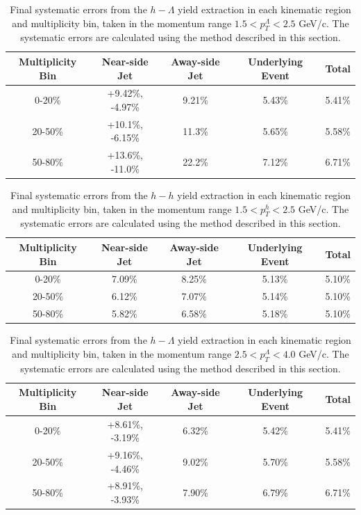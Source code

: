 \documentclass[ALICE,manyauthors]{ALICE_analysis_notes}
\begin{document}
\begin{table}[h!]
\centering
\begin{tabular}{| c | c | c | c | c | }
\hline
Multiplicity Bin & Near-side Jet & Away-side Jet & Underlying Event & Total  \\
\hline
0-20\% & +9.42\%, -4.97\% & 9.21\%  & 5.43\% & 5.41\% \\
20-50\% & +10.1\%, -6.15\%  & 11.3\%  & 5.65\% & 5.58\% \\
50-80\% & +13.6\%, -11.0\%  & 22.2\%  & 7.12\% & 6.71\% \\
\hline
\end{tabular}
\caption{Final systematic errors from the $h-\Lambda$ yield extraction in each kinematic region and multiplicity bin, taken in the momentum range $1.5 < p_{T}^{\Lambda} < 2.5$ GeV/c. The systematic errors are calculated using the method described in this section.}
\label{h_lambda_yield_extraction_systematics_lowpt}
\end{table}

\begin{table}[h!]
\centering
\begin{tabular}{| c | c | c | c | c | }
\hline
Multiplicity Bin & Near-side Jet & Away-side Jet & Underlying Event & Total  \\
\hline
0-20\% & 7.09\%   & 8.25\%  & 5.13\% & 5.10\% \\
20-50\% & 6.12\% & 7.07\%  & 5.14\% & 5.10\% \\
50-80\% & 5.82\% & 6.58\%  & 5.18\% & 5.10\% \\
\hline
\end{tabular}
\caption{Final systematic errors from the $h-h$ yield extraction in each kinematic region and multiplicity bin, taken in the momentum range $1.5 < p_{T}^{h} < 2.5$ GeV/c. The systematic errors are calculated using the method described in this section.}
\label{h_h_yield_extraction_systematics_lowpt}
\end{table}

\begin{table}[h!]
\centering
\begin{tabular}{| c | c | c | c | c | }
\hline
Multiplicity Bin & Near-side Jet & Away-side Jet & Underlying Event & Total  \\
\hline
0-20\% & +8.61\%, -3.19\% & 6.32\%  & 5.42\% & 5.41\% \\
20-50\% & +9.16\%, -4.46\%  & 9.02\%  & 5.70\% & 5.58\% \\
50-80\% & +8.91\%, -3.93\%  & 7.90\%  & 6.79\% & 6.71\% \\
\hline
\end{tabular}
\caption{Final systematic errors from the $h-\Lambda$ yield extraction in each kinematic region and multiplicity bin, taken in the momentum range $2.5 < p_{T}^{\Lambda} < 4.0$ GeV/c. The systematic errors are calculated using the method described in this section.}
\label{h_lambda_yield_extraction_systematics_highpt}
\end{table}
\end{document}
